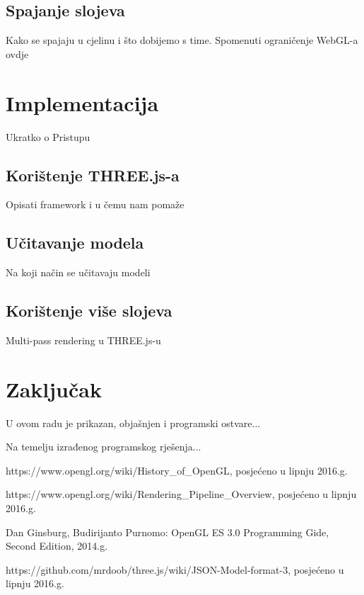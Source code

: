 \documentclass[a4paper,12pt]{extarticle}
\begin{document}
\subsection{Spajanje slojeva}

Kako se spajaju u cjelinu i što dobijemo s time. Spomenuti ograničenje WebGL-a ovdje




\section{Implementacija}

Ukratko o Pristupu

\subsection{Korištenje THREE.js-a}

Opisati framework i u čemu nam pomaže

\subsection{Učitavanje modela}

Na koji način se učitavaju modeli

\subsection{Korištenje više slojeva}

Multi-pass rendering u THREE.js-u


\section{Zaključak}

U ovom radu je prikazan, objašnjen i programski ostvare...


Na temelju izrađenog programskog rješenja...

\begin{thebibliography}{9}

	https://www.opengl.org/wiki/History\_of\_OpenGL, posjećeno u lipnju 2016.g.

	https://www.opengl.org/wiki/Rendering\_Pipeline\_Overview, posjećeno u lipnju 2016.g.
	
	Dan Ginsburg, Budirijanto Purnomo: OpenGL ES 3.0 Programming Gide, Second Edition, 2014.g.

	https://github.com/mrdoob/three.js/wiki/JSON-Model-format-3, posjećeno u lipnju 2016.g.

\end{thebibliography}
\end{document}
